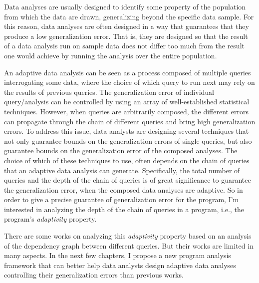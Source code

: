 
Data analyses are usually designed to identify some property of the population 
from which the data are drawn, generalizing beyond the specific data sample. 
For this reason, data analyses are often designed in a way that guarantees that they produce a low generalization error.
That is, they are designed so that the result of a data analysis run on sample data does not differ too much from the result one would achieve by running the analysis over the entire population. 

An adaptive data analysis can be seen as a process composed of multiple queries interrogating some data, where the choice of which query to run next may rely on the results of previous queries. 
The generalization error of individual query/analysis can be controlled by using an array of well-established statistical techniques.
However, when queries are arbitrarily composed, the different errors can propagate through the chain of different queries and bring high generalization errors. 
To address this issue, data analysts are designing several techniques that not only guarantee bounds on the generalization errors of single queries, but also guarantee bounds on the generalization error of the composed analyses. 
The choice of which of these techniques to use, 
often depends on the chain of queries that an adaptive data analysis can generate.
Specifically, the total number of queries and the depth of the chain of queries is of great significance 
to guarantee the generalization error, 
when the composed data analyses are adaptive. 
So in order to give a precise guarantee of generalization error
for the program,
I'm interested in analyzing the depth of the chain of queries in a program, i.e., the program's \emph{adaptivity} property.

There are some works on analyzing this \emph{adaptivity} property based on an analysis of the dependency graph between different queries.
But their works are limited in many aspects.
In the next few chapters,
I propose a new program analysis framework that can better help data analysts
design adaptive data analyses controlling their generalization errors than previous works.




